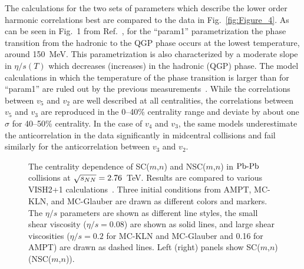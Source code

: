 The calculations for the two sets of parameters which describe the lower order harmonic correlations best are compared to the data in Fig.~\ref{fig:Figure_4}. 
As can be seen in Fig.~1 from Ref.~\cite{Niemi:2015qia}, for the ``param1'' parametrization the phase transition from the hadronic to the QGP phase occurs at the lowest temperature, around 150~MeV. This parametrization is also characterized by a moderate slope in $\eta/s(T)$ which decreases (increases) in the hadronic (QGP) phase.
The model calculations in which the temperature of the phase transition is larger than for ``param1'' are ruled out by the previous measurements~\cite{ALICE:2016kpq}.
While the correlations between $v_5$ and $v_2$ are well described at all centralities, the correlations between $v_5$ and $v_3$ are reproduced in the 0--40\% centrality range and deviate by about one $\sigma$ for 40--50\% centrality.
In the case of $v_4$ and $v_3$, the same models underestimate the anticorrelation in the data significantly in midcentral collisions and fail similarly for the anticorrelation between $v_3$ and $v_2$.

\begin{figure}[t!]
	\begin{center}
        \caption{The centrality dependence of SC($m$,$n$) and NSC($m$,$n$) in $\textnormal{Pb-Pb}$ collisions at $\sqrt{s_{NN}}=2.76$~TeV. Results are compared to various VISH2+1 calculations~\cite{Zhu:2016puf}. Three initial conditions from AMPT, MC-KLN, and MC-Glauber are drawn as different colors and markers. The $\eta/s$ parameters are shown as different line styles, the small shear viscosity ($\eta/s=0.08$) are shown as solid lines, and large shear viscosities ($\eta/s=0.2$ for MC-KLN and MC-Glauber and 0.16 for AMPT) are drawn as dashed lines. Left (right) panels show SC($m$,$n$)  (NSC($m$,$n$)).}
        \label{fig:Figure_5}
        \end{center}   
 \end{figure}
 
